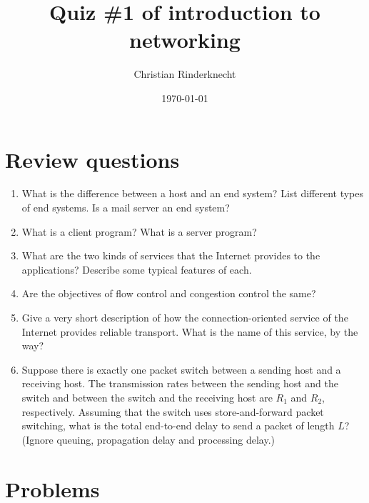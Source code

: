 \documentclass[11pt,a4paper]{article}
\title{Quiz \#1 of introduction to networking}
\author{Christian Rinderknecht}
\date{\today}
\begin{document}
\maketitle


\section{Review questions}

\begin{enumerate}

  \item What is the difference between a host and an end system? List
  different types of end systems. Is a mail server an end system?

  \item What is a client program? What is a server program? 

  \item What are the two kinds of services that the Internet provides
  to the applications? Describe some typical features of each.

  \item Are the objectives of flow control and congestion control the
  same?

  \item Give a very short description of how the connection-oriented
  service of the Internet provides reliable transport. What is the
  name of this service, by the way?

  \item Suppose there is exactly one packet switch between a sending
  host and a receiving host. The transmission rates between the
  sending host and the switch and between the switch and the receiving
  host are \(R_1\) and \(R_2\), respectively. Assuming that the switch
  uses store-and-forward packet switching, what is the total
  end-to-end delay to send a packet of length \(L\)? (Ignore queuing,
  propagation delay and processing delay.)

\end{enumerate}

\section{Problems}
\end{document}
